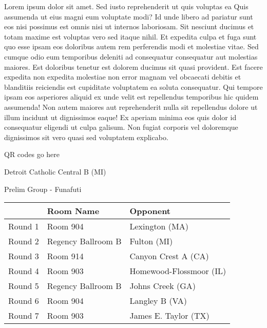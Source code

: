 \documentclass{article}%
\begin{document}
\vspace*{8pt}%
\linebreak%
\newline%
\newline%
Lorem ipsum dolor sit amet. Sed iusto reprehenderit ut quis voluptas ea Quis assumenda ut eius magni eum voluptate modi? Id unde libero ad pariatur sunt eos nisi possimus est omnis nisi ut internos laboriosam. Sit nesciunt ducimus et totam maxime est voluptas vero sed itaque nihil. Et expedita culpa et fuga sunt quo esse ipsam eos doloribus autem rem perferendis modi et molestiae vitae.\newline%
\newline%
Sed cumque odio eum temporibus deleniti ad consequatur consequatur aut molestias maiores. Est doloribus tenetur est dolorem ducimus sit quasi provident. Est facere expedita non expedita molestiae non error magnam vel obcaecati debitis et blanditiis reiciendis est cupiditate voluptatem ea soluta consequatur. Qui tempore ipsam eos asperiores aliquid ex unde velit est repellendus temporibus hic quidem assumenda!\newline%
\newline%
Non autem maiores aut reprehenderit nulla sit repellendus dolore ut illum incidunt ut dignissimos eaque! Ex aperiam minima eos quis dolor id consequatur eligendi ut culpa galisum. Non fugiat corporis vel doloremque dignissimos sit vero quasi sed voluptatem explicabo.\newline%
\newline%
%
\vspace*{30pt}%
\begin{center}%
\begin{Huge}%
QR codes go here%
\end{Huge}%
\end{center}%
\newpage%
%
\begin{center}%
\begin{Huge}%
Detroit Catholic Central B (MI)%
\end{Huge}%
\vspace*{8pt}%
\linebreak%
\begin{Large}%
Prelim Group {-} Funafuti%
\end{Large}%
\end{center}%
\begin{tabularx}{\textwidth}{|c|Y|Y|}%
\hline%
&Room Name&Opponent\\%
\hline%
Round 1&Room 904&Lexington (MA)\\%
Round 2&Regency Ballroom B&Fulton (MI)\\%
Round 3&Room 914&Canyon Crest A (CA)\\%
Round 4&Room 903&Homewood{-}Flossmoor (IL)\\%
Round 5&Regency Ballroom B&Johns Creek (GA)\\%
Round 6&Room 904&Langley B (VA)\\%
Round 7&Room 903&James E. Taylor (TX)\\%
\hline%
\end{tabularx}%
\end{document}
